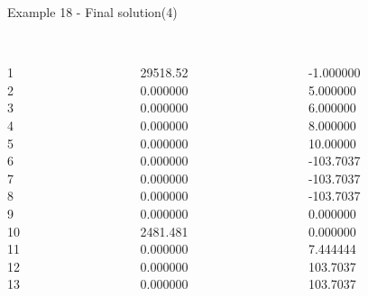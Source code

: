\begin{frame}{Example 18 - Final solution(4)}
\begin{columns}[t]
\begin{column}{0.3\textwidth}
\\
1\\
2\\
3\\
4\\
5\\
6\\
7\\
8\\
9\\
10\\
11\\
12\\
13\\
\end{column}
\begin{column}{0.3\textwidth}
\\
29518.52\\
0.000000\\
0.000000\\
0.000000\\
0.000000\\
0.000000\\
0.000000\\
0.000000\\
0.000000\\
2481.481\\
0.000000\\
0.000000\\
0.000000\\

\end{column}  

\begin{column}{0.3\textwidth}
\\
-1.000000\\
5.000000\\
6.000000\\
8.000000\\
10.00000\\
-103.7037\\
-103.7037\\
-103.7037\\
0.000000\\
0.000000\\
7.444444\\
103.7037\\
103.7037\\
\end{column}
\end{columns}
\end{frame}

